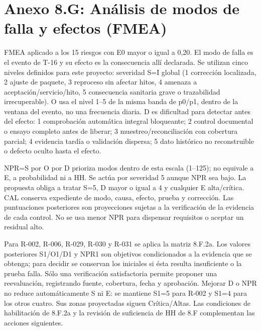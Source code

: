 \clearpage
\section{Anexo 8.G: Análisis de modos de falla y efectos (FMEA)}
FMEA aplicado a los 15 riesgos con E0 mayor o igual a 0,20. El modo de falla es el evento de T-16 y su efecto es la consecuencia allí declarada. Se utilizan cinco niveles definidos para este proyecto: severidad S=I global (1 corrección localizada, 2 ajuste de paquete, 3 reproceso sin afectar hitos, 4 amenaza a aceptación/servicio/hito, 5 consecuencia sanitaria grave o trazabilidad irrecuperable). O usa el nivel 1--5 de la misma banda de p0/p1, dentro de la ventana del evento, no una frecuencia diaria. D es dificultad para detectar antes del efecto: 1 comprobación automática integral bloqueante; 2 control documental o ensayo completo antes de liberar; 3 muestreo/reconciliación con cobertura parcial; 4 evidencia tardía o validación dispersa; 5 dato histórico no reconstruible o defecto oculto hasta el efecto.

NPR=S por O por D prioriza modos dentro de esta escala (1--125); no equivale a E, a probabilidad ni a HH. Se actúa por severidad 5 aunque NPR sea bajo. La propuesta obliga a tratar S=5, D mayor o igual a 4 y cualquier E alta/crítica. CAL conserva expediente de modo, causa, efecto, prueba y corrección. Las puntuaciones posteriores son proyecciones sujetas a la verificación de la evidencia de cada control. No se usa menor NPR para dispensar requisitos o aceptar un residual alto.

Para R-002, R-006, R-029, R-030 y R-031 se aplica la matriz 8.F.2a. Los valores
posteriores S1/O1/D1 y NPR1 son objetivos condicionados a la evidencia que se obtenga;
para decidir se conservan los iniciales si ésta resulta insuficiente o la prueba
falla. Sólo una verificación satisfactoria permite proponer una reevaluación,
registrando fuente, cobertura, fecha y aprobación. Mejorar D o NPR no reduce
automáticamente S ni E: se mantiene S1=5 para R-002 y S1=4 para los otros cuatro.
Sus zonas proyectadas siguen Crítica/Altas. Las condiciones de habilitación de
8.F.2a y la revisión de suficiencia de HH de 8.F complementan las acciones siguientes.

